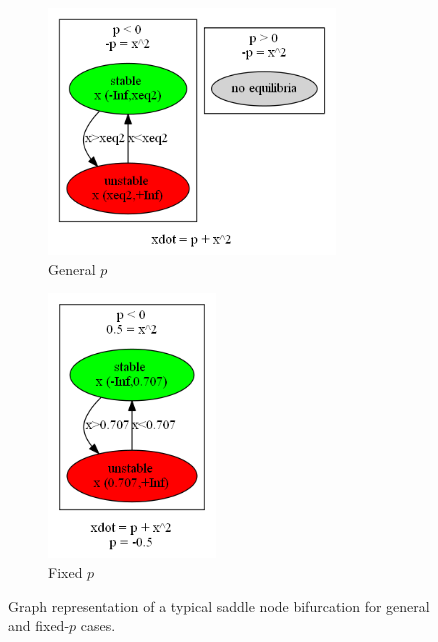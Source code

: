 \documentclass[12pt]{article}
\begin{document}
\begin{figure}[H]
\centering
\begin{subfigure}[b]{0.35\textwidth}
	\centering
	\includegraphics[width=3in]{jan20_graph_sn1.png}
	\caption{General $p$}
	\label{jan20_graph_sn1}
\end{subfigure}
\qquad \qquad
\begin{subfigure}[b]{0.4\textwidth}
	\centering
	\includegraphics[width=1.75in]{jan20_graph_sn2.png}
	\caption{Fixed $p$}
	\label{jan20_graph_sn2}
\end{subfigure}
\caption{Graph representation of a typical saddle node bifurcation for general and fixed-$p$ cases.}
\label{jan20_graph_sn}
\end{figure}
\end{document}
